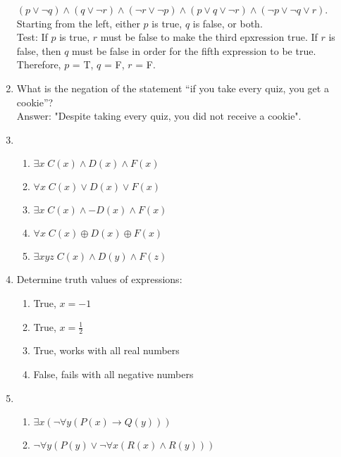 \documentclass{article}
\begin{document}
\begin{enumerate}
        $(p \lor \lnot q) \land (q \lor \lnot r) \land (\lnot r \lor \lnot p) \land (p \lor q \lor \lnot r) \land (\lnot p \lor \lnot q \lor r)$. \\
        Starting from the left, either $p$ is true, $q$ is false, or both. \\
        Test: If $p$ is true, $r$ must be false to make the third epxression true. If $r$ is false, then $q$ must be false in order for the fifth expression to be true. Therefore, $p$ = T, $q$ = F, $r$ = F. \\
    \item What is the negation of the statement “if you take every quiz, you get a cookie”? \\
        Answer: "Despite taking every quiz, you did not receive a cookie". \\
    \item
        \begin{enumerate}
            \item $\exists x\; C(x) \land D(x) \land F(x)$
            \item $\forall x\; C(x) \lor D(x) \lor F(x)$
            \item $\exists x\; C(x) \land -D(x) \land F(x)$
            \item $\forall x\; C(x) \oplus D(x) \oplus F(x)$
            \item $\exists xyz\; C(x) \land D(y) \land F(z)$
        \end{enumerate}
    \item Determine truth values of expressions:
        \begin{enumerate}
            \item True, $x=-1$
            \item True, $x=\frac{1}{2}$
            \item True, works with all real numbers
            \item False, fails with all negative numbers
        \end{enumerate}
    \item
        \begin{enumerate}
            \item $\exists x (\lnot \forall y (P(x) \to Q(y)))$
            \item $\lnot \forall y (P(y) \lor  \lnot \forall x (R(x) \land R(y)))$
        \end{enumerate}
\end{enumerate}
\end{document}
